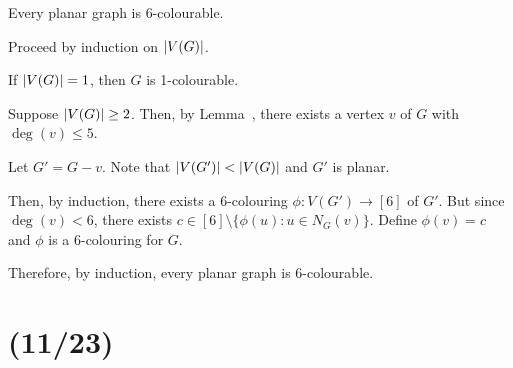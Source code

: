 \begin{theorem}
  Every planar graph is 6-colourable.
\end{theorem}
\begin{prf}
  Proceed by induction on $\abs{V(G)}$.

  If $\abs{V(G)} = 1$, then $G$ is 1-colourable.

  Suppose $\abs{V(G)} \geq 2$.
  Then, by Lemma~,
  there exists a vertex $v$ of $G$ with $\deg(v) \leq 5$.

  Let $G' = G-v$. Note that $\abs{V(G')} < \abs{V(G)}$ and $G'$ is planar.

  Then, by induction, there exists a 6-colouring $\phi : V(G') \to [6]$ of $G'$.
  But since $\deg(v) < 6$, there exists
  $c \in [6] \setminus \{\phi(u) : u \in N_G(v)\}$.
  Define $\phi(v) = c$ and $\phi$ is a 6-colouring for $G$.

  Therefore, by induction, every planar graph is 6-colourable.
\end{prf}

\section{(11/23)}

